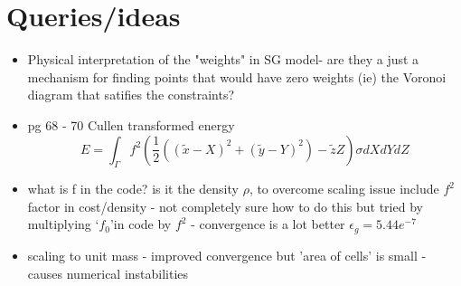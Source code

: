\documentclass[]{article}
\begin{document}
	\section{Queries/ideas}
	\begin{itemize}
		\item Physical interpretation of 
		the "weights" in SG model- are they a just a mechanism for finding points that would have zero weights (ie) the Voronoi diagram that satifies the constraints?
		\item pg 68 - 70 Cullen \cite{Cullen2008} transformed energy
		 \begin{equation}
		 E = \int_ \Gamma f^2 \left(\frac{1}{2}\left(\left( \tilde{x} - X\right)^2 +\left(\tilde{y} - Y\right)^2\right) - \tilde{z}Z\right)\sigma dXdYdZ
		 \end{equation}
		 \item what is f in the code? is it the density $\rho$, to overcome scaling issue include $f^2$ factor in cost/density - not completely sure how to do this but tried by multiplying \textquoteleft$f_0$\textquoteright in code by $f^2$ - convergence is a lot better $\epsilon_g = 5.44 e^{-7}$
		 \item scaling to unit mass - improved convergence but 'area of cells' is small - causes numerical instabilities
	\end{itemize}

\newpage


\end{document}
